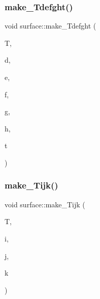 \subsubsection{\texorpdfstring{make\+\_\+\+Tdefght()}{make\_Tdefght()}}
{\footnotesize\ttfamily void surface\+::make\+\_\+\+Tdefght (\begin{DoxyParamCaption}\item[{\mbox{\hyperlink{galois_8h_a09fddde158a3a20bd2dcadb609de11dc}{I\+NT}} $\ast$}]{T,  }\item[{\mbox{\hyperlink{galois_8h_a09fddde158a3a20bd2dcadb609de11dc}{I\+NT}}}]{d,  }\item[{\mbox{\hyperlink{galois_8h_a09fddde158a3a20bd2dcadb609de11dc}{I\+NT}}}]{e,  }\item[{\mbox{\hyperlink{galois_8h_a09fddde158a3a20bd2dcadb609de11dc}{I\+NT}}}]{f,  }\item[{\mbox{\hyperlink{galois_8h_a09fddde158a3a20bd2dcadb609de11dc}{I\+NT}}}]{g,  }\item[{\mbox{\hyperlink{galois_8h_a09fddde158a3a20bd2dcadb609de11dc}{I\+NT}}}]{h,  }\item[{\mbox{\hyperlink{galois_8h_a09fddde158a3a20bd2dcadb609de11dc}{I\+NT}}}]{t }\end{DoxyParamCaption})}

\mbox{\label{classsurface_a07d7b3ebddf5c688ed650d0c20e452e2}} 
\subsubsection{\texorpdfstring{make\+\_\+\+Tijk()}{make\_Tijk()}}
{\footnotesize\ttfamily void surface\+::make\+\_\+\+Tijk (\begin{DoxyParamCaption}\item[{\mbox{\hyperlink{galois_8h_a09fddde158a3a20bd2dcadb609de11dc}{I\+NT}} $\ast$}]{T,  }\item[{\mbox{\hyperlink{galois_8h_a09fddde158a3a20bd2dcadb609de11dc}{I\+NT}}}]{i,  }\item[{\mbox{\hyperlink{galois_8h_a09fddde158a3a20bd2dcadb609de11dc}{I\+NT}}}]{j,  }\item[{\mbox{\hyperlink{galois_8h_a09fddde158a3a20bd2dcadb609de11dc}{I\+NT}}}]{k }\end{DoxyParamCaption})}

\mbox{\label{classsurface_a677b8ef6b4829f4848651c21ee7c741e}} 
